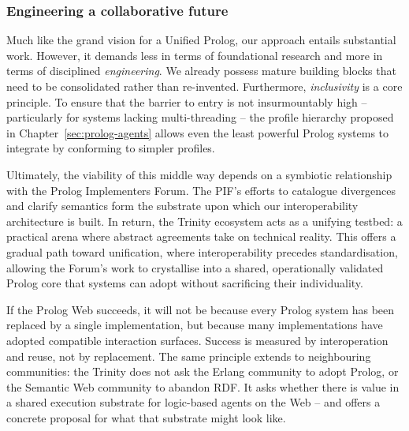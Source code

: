 \subsubsection{Engineering a collaborative future}

Much like the grand vision for a Unified Prolog, our approach entails
substantial work. However, it demands less in terms of foundational
research and more in terms of disciplined \textit{engineering}. We
already possess mature building blocks that need to be consolidated
rather than re-invented. Furthermore, \textit{inclusivity} is a core
principle. To ensure that the barrier to entry is not insurmountably
high -- particularly for systems lacking multi-threading -- the
profile hierarchy proposed in Chapter~\ref{sec:prolog-agents} allows
even the least powerful Prolog systems to integrate by conforming to
simpler profiles.

Ultimately, the viability of this middle way depends on a symbiotic
relationship with the Prolog Implementers Forum. The PIF's efforts to
catalogue divergences and clarify semantics form the substrate upon
which our interoperability architecture is built. In return, the
Trinity ecosystem acts as a unifying testbed: a practical arena where
abstract agreements take on technical reality. This offers a gradual
path toward unification, where interoperability precedes
standardisation, allowing the Forum's work to crystallise into a
shared, operationally validated Prolog core that systems can adopt
without sacrificing their individuality.

If the Prolog Web succeeds, it will not be because every Prolog
system has been replaced by a single implementation, but because many
implementations have adopted compatible interaction surfaces. Success
is measured by interoperation and reuse, not by replacement. The same
principle extends to neighbouring communities: the Trinity does not
ask the Erlang community to adopt Prolog, or the Semantic Web
community to abandon RDF. It asks whether there is value in a shared
execution substrate for logic-based agents on the Web -- and offers a
concrete proposal for what that substrate might look like.




